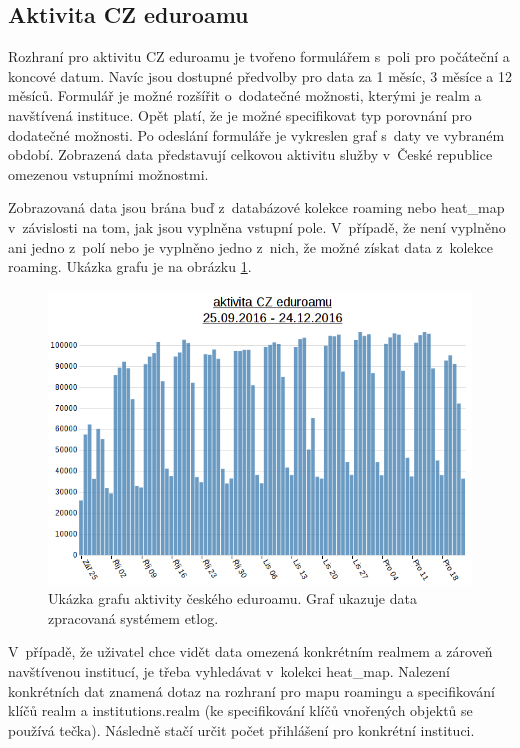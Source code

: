 \documentclass[thesis=M,czech]{FITthesis}[2012/06/26]
\begin{document}
    \subsection{Aktivita CZ eduroamu}
    
      Rozhraní pro aktivitu CZ eduroamu je tvořeno
      formulářem s~poli pro počáteční a koncové datum.
      Navíc jsou dostupné předvolby pro data za 1 měsíc, 3 měsíce a 12 měsíců.
      Formulář je možné rozšířit o~dodatečné možnosti, kterými je realm a navštívená instituce.
      Opět platí, že je možné specifikovat typ porovnání pro dodatečné možnosti.
      Po odeslání formuláře je vykreslen graf s~daty ve vybraném období.
      Zobrazená data představují celkovou aktivitu služby v~České republice
      omezenou vstupními možnostmi.

      Zobrazovaná data jsou brána buď z~databázové kolekce roaming nebo heat\_map
      v~závislosti na tom, jak jsou vyplněna vstupní pole.
      V~případě, že není vyplněno ani jedno z~polí nebo je vyplněno jedno z~nich,
      že možné získat data z~kolekce roaming.
      Ukázka grafu je na obrázku \ref{fig:eduroam_activity}.

      \begin{figure}
        \centering
          \includegraphics[scale=0.5]{eduroam_activity.png}
        \caption[Ukázka grafu aktivity českého eduroamu]{Ukázka grafu aktivity českého eduroamu. Graf ukazuje data zpracovaná systémem etlog.}
        \label{fig:eduroam_activity}
      \end{figure}

      V~případě, že uživatel chce vidět data omezená konkrétním realmem a zároveň
      navštívenou institucí, je třeba vyhledávat v~kolekci heat\_map.
      Nalezení konkrétních dat znamená dotaz na rozhraní pro mapu roamingu
      a specifikování klíčů realm a institutions.realm 
      (ke specifikování klíčů vnořených objektů se používá tečka). 
      Následně stačí určit počet přihlášení pro konkrétní instituci.
\end{document}
